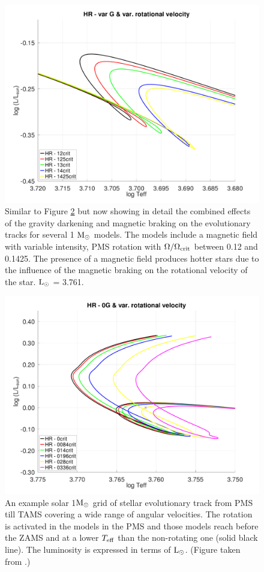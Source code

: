 \documentclass[fleqn,usenatbib]{mnras}
\begin{document}
\begin{figure}
	\includegraphics[clip,width=\columnwidth]{figures/paper2/hr_var_vel_var_g_z13.pdf}
    \caption{Similar to Figure \ref{fig:hr_var_vel_0g} but now showing in detail the combined effects of the gravity darkening and magnetic braking on the evolutionary tracks for several 1 $\mathrm{M}_\odot$ models. The models include a magnetic field with variable intensity, PMS rotation with $\Omega / \Omega_{\mathrm{crit}}$ between 0.12 and 0.1425. The presence of a magnetic field produces hotter stars due to the influence of the magnetic braking on the rotational velocity of the star. $\mathrm{L}_\odot$ = 3.761.}
    \label{fig:hr_var_vel_var_g_z13}
\end{figure}

\begin{figure}
	\includegraphics[trim = 10mm 10mm 15mm 10mm, clip,width=\columnwidth]{figures/paper2/hr_var_vel_0_0g_z10.pdf}
    \caption{An example solar 1$\mathrm{M}_\odot$ grid of stellar evolutionary track from PMS till TAMS covering a wide range of angular velocities. The rotation is activated in the models in the PMS and those models reach before the ZAMS and at a lower $T_{\mathrm{eff}}$ than the non-rotating one (solid black line). The luminosity is expressed in terms of $\mathrm{L}_\odot$. (Figure taken from \citet{Navarro2020}.)}
    \label{fig:hr_var_vel_0g}
\end{figure}
\end{document}
